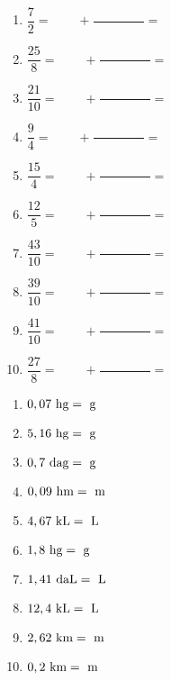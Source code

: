 \documentclass[a4paper,11pt,fleqn]{article}
\begin{document}

\begin{multicols}{2}
\begin{enumerate}[itemsep=2em]
	\item $ \dfrac{7}{2} = \phantom{0000} + \dfrac{\phantom{00000000}}{} =  $
	\item $ \dfrac{25}{8} = \phantom{0000} + \dfrac{\phantom{00000000}}{} =  $
	\item $ \dfrac{21}{10} = \phantom{0000} + \dfrac{\phantom{00000000}}{} =  $
	\item $ \dfrac{9}{4} = \phantom{0000} + \dfrac{\phantom{00000000}}{} =  $
	\item $ \dfrac{15}{4} = \phantom{0000} + \dfrac{\phantom{00000000}}{} =  $
	\item $ \dfrac{12}{5} = \phantom{0000} + \dfrac{\phantom{00000000}}{} =  $
	\item $ \dfrac{43}{10} = \phantom{0000} + \dfrac{\phantom{00000000}}{} =  $
	\item $ \dfrac{39}{10} = \phantom{0000} + \dfrac{\phantom{00000000}}{} =  $
	\item $ \dfrac{41}{10} = \phantom{0000} + \dfrac{\phantom{00000000}}{} =  $
	\item $ \dfrac{27}{8} = \phantom{0000} + \dfrac{\phantom{00000000}}{} =  $
\end{enumerate}
\end{multicols}


\begin{multicols}{2}
\begin{enumerate}[itemsep=2em]
	\item $ 0,07~\text{hg} = \dotfill ~\text{g}$
	\item $ 5,16~\text{hg} = \dotfill ~\text{g}$
	\item $ 0,7~\text{dag} = \dotfill ~\text{g}$
	\item $ 0,09~\text{hm} = \dotfill ~\text{m}$
	\item $ 4,67~\text{kL} = \dotfill ~\text{L}$
	\item $ 1,8~\text{hg} = \dotfill ~\text{g}$
	\item $ 1,41~\text{daL} = \dotfill ~\text{L}$
	\item $ 12,4~\text{kL} = \dotfill ~\text{L}$
	\item $ 2,62~\text{km} = \dotfill ~\text{m}$
	\item $ 0,2~\text{km} = \dotfill ~\text{m}$
\end{enumerate}
\end{multicols}
\end{document}
